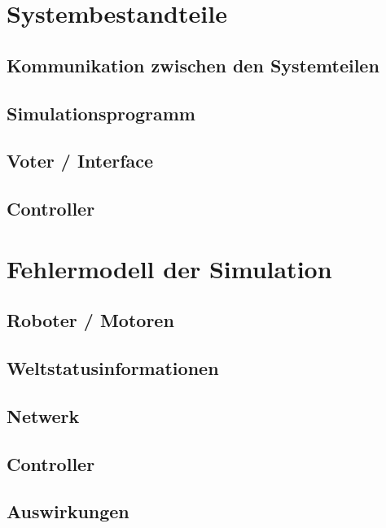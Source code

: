 \documentclass[ngerman]{scrartcl}
\begin{document}
\section{Systembestandteile}
\subsection{Kommunikation zwischen den Systemteilen} %
\subsection{Simulationsprogramm}\label{graphics} %
\subsection{Voter / Interface}
\subsection{Controller}
\section{Fehlermodell der Simulation}\label{fm}
\subsection{Roboter / Motoren}
\subsection{Weltstatusinformationen}
\subsection{Netwerk}
\subsection{Controller}
\subsection{Auswirkungen}
\end{document}
